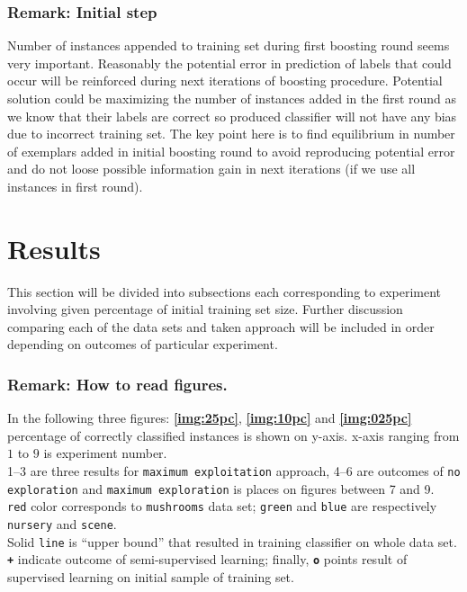 \documentclass[12pt, a4paper, pdflatex]{report}
\begin{document}
\subsubsection{Remark: Initial step}
Number of instances appended to training set during first boosting round seems very important. Reasonably the potential error in prediction of labels that could occur will be reinforced during next iterations of boosting procedure. Potential solution could be maximizing the number of instances added in the first round as we know that their labels are correct so produced classifier will not have any bias due to incorrect training set. The key point here is to find equilibrium in number of exemplars added in initial boosting round to avoid reproducing potential error and do not loose possible information gain in next iterations (if we use all instances in first round).


\section{Results~\cite{results}}
This section will be divided into subsections each corresponding to experiment involving given percentage of initial training set size. Further discussion comparing each of the data sets and taken approach will be included in order depending on outcomes of particular experiment.

\subsubsection{Remark: How to read figures.}
In the following three figures: \textbf{\ref{img:25pc}}, \textbf{\ref{img:10pc}} and \textbf{\ref{img:025pc}} percentage of correctly classified instances is shown on y-axis. x-axis ranging from $1$ to $9$ is experiment number.\\
1--3 are three results for \texttt{maximum exploitation} approach, 4--6 are outcomes of \texttt{no exploration} and \texttt{maximum exploration} is places on figures between 7 and 9.\\
\texttt{red} color corresponds to \texttt{mushrooms} data set; \texttt{green} and \texttt{blue} are respectively \texttt{nursery} and \texttt{scene}.\\
Solid \texttt{line} is ``upper bound'' that resulted in training classifier on whole data set. \texttt{\textbf{+}} indicate outcome of semi-supervised learning; finally, \texttt{\textbf{o}} points result of supervised learning on initial sample of training set.
\end{document}
